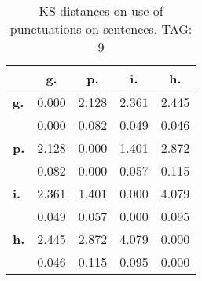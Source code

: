 \begin{table}[h!]
\begin{center}
\begin{tabular}{| l || c | c | c | c |}\hline
 & {\bf g.} & {\bf p.} & {\bf i.} & {\bf h.} \\\hline\hline
{\bf g.} & 0.000 & 2.128 & 2.361 & 2.445 \\
{\bf } & 0.000 & 0.082 & 0.049 & 0.046 \\\hline
{\bf p.} & 2.128 & 0.000 & 1.401 & 2.872 \\
{\bf } & 0.082 & 0.000 & 0.057 & 0.115 \\\hline
{\bf i.} & 2.361 & 1.401 & 0.000 & 4.079 \\
{\bf } & 0.049 & 0.057 & 0.000 & 0.095 \\\hline
{\bf h.} & 2.445 & 2.872 & 4.079 & 0.000 \\
{\bf } & 0.046 & 0.115 & 0.095 & 0.000 \\\hline
\end{tabular}
\caption{KS distances on use of punctuations on sentences. TAG: 9}
\end{center}
\end{table}